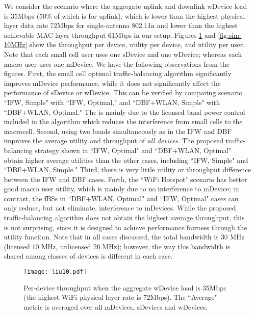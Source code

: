 \documentclass[journal,final,letterpaper,10pt,doublecolumn,twoside]{IEEEtran}
\begin{document}
We consider the scenario where the aggregate uplink and downlink wDevice load is 35Mbps (50\% of which is for uplink), which is
lower than the highest physical layer data rate 72Mbps for single-antenna 802.11n and lower than the highest achievable MAC layer throughput 61Mbps in our setup.
Figures \ref{fig:Thru-10MHz} and \ref{fig:sim-10MHz} show the throughput per device, utility per device, and utility per user. Note that each small cell user uses one sDevice and one wDevice; whereas each macro user uses one mDevice.  We have the
following observations from the figures. First, the small cell
optimal traffic-balancing algorithm significantly improves mDevice performance, while it does not significantly affect the
performance of sDevice or wDevice.  This can be verified by
comparing scenario ``IFW, Simple" with ``IFW, Optimal," and ``DBF+WLAN,
Simple" with ``DBF+WLAN, Optimal." The is mainly due to the licensed band
power control included in the algorithm which reduces the
interference from small cells to the macrocell.   Second, using two
bands  simultaneously  as in the IFW and DBF improves the average
utility and throughput of \emph{all devices}.  The proposed
traffic-balancing strategy shown in ``IFW, Optimal" and ``DBF+WLAN,
Optimal" obtain higher average utilities than the other cases,
including ``IFW, Simple" and ``DBF+WLAN, Simple." Third, there is very
little utility or throughput difference between the IFW and DBF
cases. Forth, the ``WiFi Hotspot" scenario has better good macro user utility,
which is mainly due to no interference to mDevice; in contrast, the fBSs in ``DBF+WLAN, Optimal" and ``IFW, Optimal" cases can only reduce, but not eliminate, interference to mDevices. While the proposed traffic-balancing algorithm does not
obtain the highest average throughput, this is not surprising, since
it is designed to achieve performance fairness through the utility
function. Note that in all cases discussed,  the total bandwidth is
30 MHz (licensed 10 MHz, unlicensed 20 MHz); however, the way this
bandwidth is shared among classes of devices is different in each
case.


\begin{figure}
  \center
  \texttt{[image: liu10.pdf]}
  \caption{ Per-device throughput  when the aggregate wDevice load is
35Mbps (the highest WiFi physical layer rate is 72Mbps). The ``Average" metric is
averaged over all mDevices, sDevices and wDevices. } \label{fig:Thru-10MHz}
\end{figure}
\end{document}
